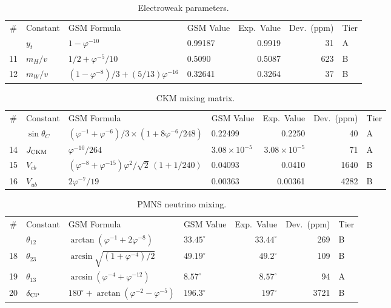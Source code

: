\documentclass[aps,prd,twocolumn,superscriptaddress,nofootinbib,showpacs]{revtex4-2}
\begin{document}
\begin{table}[t]
\caption{\label{tab:electroweak}Electroweak parameters.}
\begin{ruledtabular}
\begin{tabular}{clllrrl}
\# & Constant & GSM Formula & GSM Value & Exp.\ Value & Dev.\ (ppm) & Tier \\
\colrule
10 & $y_t$ & $1-\varphi^{-10}$ & 0.99187 & 0.9919 & 31 & A \\
11 & $m_H/v$ & $1/2+\varphi^{-5}/10$ & 0.5090 & 0.5087 & 623 & B \\
12 & $m_W/v$ & $(1-\varphi^{-8})/3+(5/13)\varphi^{-16}$ & 0.32641 & 0.3264 & 37 & B \\
\end{tabular}
\end{ruledtabular}
\end{table}

\begin{table}[t]
\caption{\label{tab:ckm}CKM mixing matrix.}
\begin{ruledtabular}
\begin{tabular}{clllrrl}
\# & Constant & GSM Formula & GSM Value & Exp.\ Value & Dev.\ (ppm) & Tier \\
\colrule
13 & $\sin\theta_C$ & $(\varphi^{-1}+\varphi^{-6})/3 \times (1+8\varphi^{-6}/248)$ & 0.22499 & 0.2250 & 40 & A \\
14 & $J_{\rm CKM}$ & $\varphi^{-10}/264$ & $3.08\times10^{-5}$ & $3.08\times10^{-5}$ & 71 & A \\
15 & $V_{cb}$ & $(\varphi^{-8}+\varphi^{-15})\varphi^2/\sqrt{2}\,(1+1/240)$ & 0.04093 & 0.0410 & 1640 & B \\
16 & $V_{ub}$ & $2\varphi^{-7}/19$ & 0.00363 & 0.00361 & 4282 & B \\
\end{tabular}
\end{ruledtabular}
\end{table}

\begin{table}[t]
\caption{\label{tab:pmns}PMNS neutrino mixing.}
\begin{ruledtabular}
\begin{tabular}{clllrrl}
\# & Constant & GSM Formula & GSM Value & Exp.\ Value & Dev.\ (ppm) & Tier \\
\colrule
17 & $\theta_{12}$ & $\arctan(\varphi^{-1}+2\varphi^{-8})$ & $33.45^\circ$ & $33.44^\circ$ & 269 & B \\
18 & $\theta_{23}$ & $\arcsin\!\sqrt{(1+\varphi^{-4})/2}$ & $49.19^\circ$ & $49.2^\circ$ & 109 & B \\
19 & $\theta_{13}$ & $\arcsin(\varphi^{-4}+\varphi^{-12})$ & $8.57^\circ$ & $8.57^\circ$ & 94 & A \\
20 & $\delta_{\rm CP}$ & $180^\circ+\arctan(\varphi^{-2}-\varphi^{-5})$ & $196.3^\circ$ & $197^\circ$ & 3721 & B \\
\end{tabular}
\end{ruledtabular}
\end{table}
\end{document}
